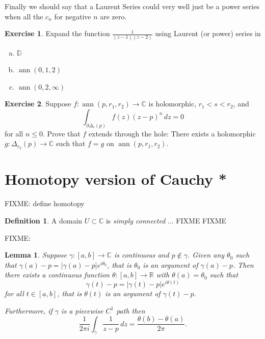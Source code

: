 \documentclass[12pt,openany]{book}
\newcommand{\ann}{\operatorname{ann}}
\newcommand{\sabs}[1]{\lvert {#1} \rvert}
\newcommand{\C}{{\mathbb{C}}}
\newcommand{\R}{{\mathbb{R}}}
\newcommand{\D}{{\mathbb{D}}}
\newcommand{\myindex}[1]{#1\index{#1}}
\theoremstyle{plain}
\newtheorem{lemma}[thm]{Lemma}
\theoremstyle{remark}
\theoremstyle{definition}
\newtheorem{defn}[thm]{Definition}
\newenvironment{exbox}{%
    \def\FrameCommand{\vrule width 1pt \relax\hspace {10pt}}%
    \MakeFramed {\advance \hsize -\width \FrameRestore }%
}{%
    \endMakeFramed
}
\newenvironment{exparts}{%
    \leavevmode\begin{enumerate}[a),noitemsep,topsep=0pt,parsep=0pt,partopsep=0pt]
}{%
    \end{enumerate}
}
\theoremstyle{exercise}
\newtheorem{exercise}{Exercise}[section]
\theoremstyle{example}
\begin{document}
Finally we should say that a Laurent Series could very well just be a power
series when all the $c_n$ for negative $n$ are zero.

\begin{exbox}
\begin{exercise}
Expand the function $\frac{1}{(z-1)(z-2)}$ using Laurent (or power) series in 
\begin{exparts}
\item $\D$
\item $\ann(0,1,2)$
\item $\ann(0,2,\infty)$
\end{exparts}
\end{exercise}

\begin{exercise}
Suppose $f \colon \ann(p,r_1,r_2) \to \C$ is holomorphic,
$r_1 < s < r_2$, and
\begin{equation*}
\int_{\partial \Delta_{s}(p)} f(z){(z-p)}^n
 \, dz = 0
\end{equation*}
for all $n \leq 0$.  Prove that $f$ extends through the hole:
There exists a holomorphic $g \colon \Delta_{r_2}(p) \to \C$ such that 
$f = g$ on $\ann(p,r_1,r_2)$.
\end{exercise}
\end{exbox}


\section{Homotopy version of Cauchy *}

FIXME: define homotopy

\begin{defn}
A domain $U \subset \C$ is \emph{\myindex{simply connected}}
... FIXME FIXME
%
\end{defn}

FIXME:

\begin{lemma}
Suppose $\gamma \colon [a,b] \to \C$ is continuous and $p \notin
\gamma$.  Given any $\theta_0$ such that
$\gamma(a)-p = \sabs{\gamma(a)-p} e^{i\theta_0}$, that is $\theta_0$ is
an argument of $\gamma(a)-p$.
Then there exists a continuous function
$\theta \colon [a,b] \to \R$ with $\theta(a) = \theta_0$ such that
\begin{equation*}
\gamma(t)-p = \sabs{\gamma(t)-p} e^{i\theta(t)}
\end{equation*}
for all $t \in [a,b]$, that is $\theta(t)$ is an argument of $\gamma(t)-p$.

Furthermore, if $\gamma$ is a piecewise $C^1$ path then
\begin{equation*}
\frac{1}{2\pi i} \int_\gamma \frac{1}{z-p} \, dz =
\frac{\theta(b)-\theta(a)}{2\pi} .
\end{equation*}
\end{lemma}
\end{document}
